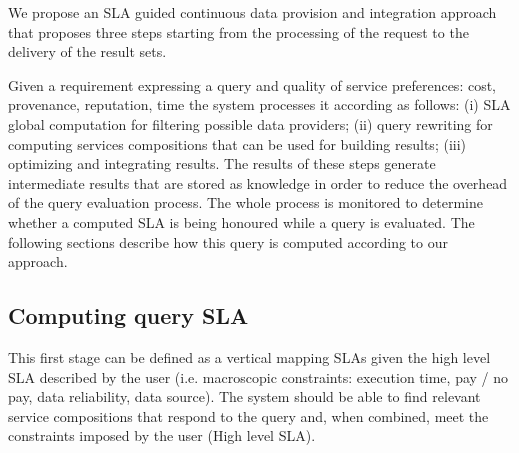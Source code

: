 We propose an SLA guided continuous data provision and integration approach that proposes three steps  starting from the processing of the request  to the delivery of the result sets.

Given a requirement expressing a query and quality of service preferences: cost, provenance, reputation, time the system processes it according as follows: (i) SLA global computation for filtering possible data providers; (ii) query rewriting for computing services compositions that can be used for building results; (iii) optimizing and integrating results. The results of these steps generate intermediate results that are stored as knowledge in order to reduce the overhead of the query evaluation process. The whole process is monitored to determine whether a computed SLA is being honoured while a query is evaluated. 
The following sections describe how this query is computed according to our approach. 





\subsection{Computing query SLA}
\label{sec:slaModel}

%

This first stage can be defined as a vertical mapping SLAs given the high level SLA described by the user (i.e. macroscopic constraints: execution time, pay / no pay, data reliability, data source). The system should be able to find relevant service compositions that respond to the query and, when combined, meet the constraints imposed by the user (High level SLA).

